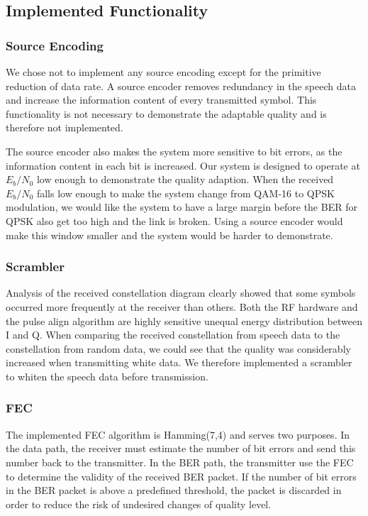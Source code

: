 \subsection{Implemented Functionality}
\subsubsection{Source Encoding}
We chose not to implement any source encoding except for the primitive reduction of data rate. A source encoder removes redundancy in the speech data and increase the information content of every transmitted symbol. This functionality is not necessary to demonstrate the adaptable quality and is therefore not implemented. 

The source encoder also makes the system more sensitive to bit errors, as the information content in each bit is increased. Our system is designed to operate at $E_b / N_0$ low enough to demonstrate the quality adaption. When the received $E_b / N_0$ falls low enough to make the system change from QAM-16 to QPSK modulation, we would like the system to have a large margin before the BER for QPSK also get too high and the link is broken. Using a source encoder would make this window smaller and the system would be harder to demonstrate. 

\subsubsection{Scrambler}
Analysis of the received constellation diagram clearly showed that some symbols occurred more frequently at the receiver than others. Both the RF hardware and the pulse align algorithm are highly sensitive unequal energy distribution between I and Q. When comparing the received constellation from speech data to the constellation from random data, we could see that the quality was considerably increased when transmitting white data. We therefore implemented a scrambler to whiten the speech data before transmission. 

\subsubsection{FEC}
The implemented FEC algorithm is Hamming(7,4) and serves two purposes. In the data path, the receiver must estimate the number of bit errors and send this number back to the transmitter. In the BER path, the transmitter use the FEC to determine the validity of the received BER packet. If the number of bit errors in the BER packet is above a predefined threshold, the packet is discarded in order to reduce the risk of undesired changes of quality level. 

